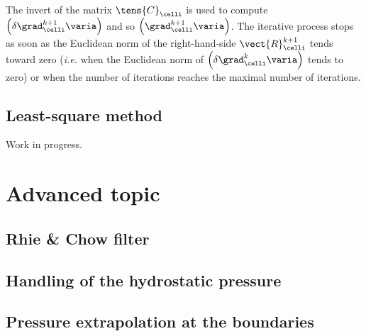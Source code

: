 The invert of the matrix $\tens{C}_{\celli}$ is used to compute $\left( \delta \grad_\celli^{k+1} \varia \right)$ 
and so $\left( \grad^{k+1}_{\celli} \varia \right)$. The iterative process stops as soon as the Euclidean norm of the right-hand-side $\vect{R}^{k+1}_{\celli}$ tends toward zero (\emph{i.e.} when the Euclidean norm
of $\left( \delta \grad^{k}_{\celli} \varia \right)$ tends to zero) or when the number of iterations reaches the maximal number of iterations.




\subsection{Least-square method}
Work in progress.


\section{Advanced topic}

\subsection{Rhie \& Chow filter}


\subsection{Handling of the hydrostatic pressure}

\subsection{Pressure extrapolation at the boundaries}



